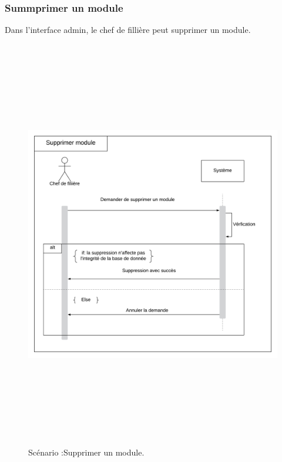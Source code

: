 \subsubsection*{Summprimer un  module}
Dans l'interface admin, le chef de fillière peut supprimer un module.
 \begin{figure}[!htb]
      \centering
        \includegraphics[width=15cm,height=18cm]{img/SupprimerModule.png}
        \caption{Scénario :Supprimer un module.}
    \end{figure}









